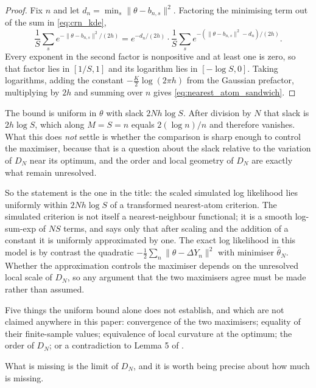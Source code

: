 \documentclass[11pt]{article}
\theoremstyle{definition}
\begin{document}
\begin{proof}
Fix $n$ and let $d_n=\min_s\lVert\theta-b_{n,s}\rVert^2$. Factoring the minimising term out of the sum in \eqref{eq:crn_kde},
\[
\frac1S\sum_s e^{-\lVert\theta-b_{n,s}\rVert^2/(2h)}
=e^{-d_n/(2h)}\cdot\frac1S\sum_s e^{-(\lVert\theta-b_{n,s}\rVert^2-d_n)/(2h)} .
\]
Every exponent in the second factor is nonpositive and at least one is zero, so that factor lies in $[1/S,1]$ and its logarithm lies in $[-\log S,0]$. Taking logarithms, adding the constant $-\tfrac K2\log(2\pi h)$ from the Gaussian prefactor, multiplying by $2h$ and summing over $n$ gives \eqref{eq:nearest_atom_sandwich}.
\end{proof}

The bound is uniform in $\theta$ with slack $2Nh\log S$. After division by $N$ that slack is $2h\log S$, which along $M=S=n$ equals $2(\log n)/n$ and therefore vanishes. What this does \emph{not} settle is whether the comparison is sharp enough to control the maximiser, because that is a question about the slack relative to the variation of $D_N$ near its optimum, and the order and local geometry of $D_N$ are exactly what remain unresolved.

So the statement is the one in the title: the scaled simulated log likelihood lies uniformly within $2Nh\log S$ of a transformed nearest-atom criterion. The simulated criterion is not itself a nearest-neighbour functional; it is a smooth log-sum-exp of $NS$ terms, and  says only that after scaling and the addition of a constant it is uniformly approximated by one. The exact log likelihood in this model is by contrast the quadratic $-\tfrac12\sum_n\lVert\theta-\Delta Y_n\rVert^2$ with minimiser $\widehat\theta_N$. Whether the approximation controls the maximiser depends on the unresolved local scale of $D_N$, so any argument that the two maximisers agree must be made rather than assumed.

Five things the uniform bound alone does not establish, and which are not claimed anywhere in this paper: convergence of the two maximisers; equality of their finite-sample values; equivalence of local curvature at the optimum; the order of $D_N$; or a contradiction to Lemma 5 of \citet{BrandtSantaClara2002}.

What is missing is the limit of $D_N$, and it is worth being precise about how much is missing.
\end{document}
